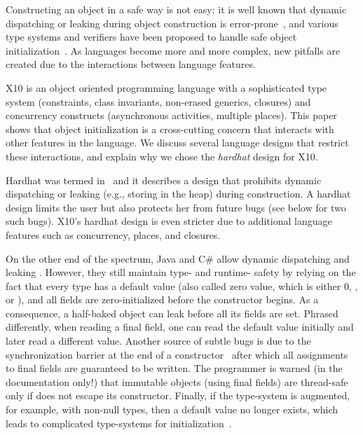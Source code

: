 Constructing an object in a safe way is not easy:
    it is well known that dynamic dispatching
    or leaking \this during object construction
    is error-prone~\cite{Dean:1996,Seo:2007:SBD:1522565.1522587,Gil:2009:WRS:1615184.1615216},
    and various type systems and verifiers have been proposed to
    handle safe object initialization~\cite{Hubert:2010:ESO:1888881.1888890,Zibin:2010:OIG:1869459.1869509,Fahndrich:2007:EOI:1297027.1297052,XinQi:2009}.
As languages become more and more complex,
    new pitfalls are created due to the interactions between
    language features.

X10 is an object oriented programming language with a sophisticated
    type system (constraints, class invariants, non-erased generics, closures)
    and concurrency constructs (asynchronous activities, multiple places).
This paper shows that object initialization is a cross-cutting concern
    that interacts with other features in the language.
We discuss several language designs that restrict these interactions,
    and explain why we chose the \emph{hardhat} design for X10.

{Hardhat} was termed in~\cite{Gil:2009:WRS:1615184.1615216}
    and it describes a design that prohibits dynamic dispatching
    or leaking \this (e.g., storing \this in the heap) during construction.
A hardhat design limits the user
    but also protects her from future bugs
    (see  below for two such bugs).
X10's hardhat design is even stricter due to additional language features
    such as concurrency, places, and closures.

On the other end of the spectrum,
    Java and C\# allow
    dynamic dispatching and leaking \this.
However, they still maintain type- and runtime- safety
    by relying on the fact that every type has a default value
    (also called zero value, which is either 0, , or ),
    and all fields are zero-initialized before the constructor begins.
As a consequence,
    a half-baked object can leak before all its fields are set. %
Phrased differently,
    when reading a final field, one can read the default value initially and later read a different value.
Another source of subtle bugs is due to the synchronization barrier
    at the end of a constructor~\cite{JSR133}
    after which all assignments to final fields are guaranteed to be written.
The programmer is warned (in the documentation only!)
    that immutable objects (using final fields) are thread-safe only if
    \this does not escape its constructor.
Finally, if the type-system is augmented, for example, with non-null types, then
    a default value no longer exists,
    which leads to complicated type-systems for initialization~\cite{Fahndrich:2007:EOI:1297027.1297052,XinQi:2009}.

